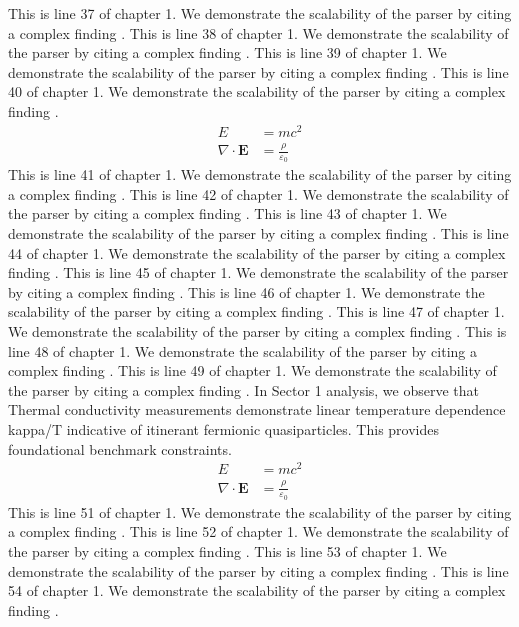 This is line 37 of chapter 1. We demonstrate the scalability of the parser by citing a complex finding \cite{ref1_37}.
This is line 38 of chapter 1. We demonstrate the scalability of the parser by citing a complex finding \cite{ref1_38}.
This is line 39 of chapter 1. We demonstrate the scalability of the parser by citing a complex finding \cite{ref1_39}.
This is line 40 of chapter 1. We demonstrate the scalability of the parser by citing a complex finding \cite{ref1_40}.
\begin{align*}
  E &= mc^2 \\
  \nabla \cdot \mathbf{E} &= \frac{\rho}{\varepsilon_0}
\end{align*}
This is line 41 of chapter 1. We demonstrate the scalability of the parser by citing a complex finding \cite{ref1_41}.
This is line 42 of chapter 1. We demonstrate the scalability of the parser by citing a complex finding \cite{ref1_42}.
This is line 43 of chapter 1. We demonstrate the scalability of the parser by citing a complex finding \cite{ref1_43}.
This is line 44 of chapter 1. We demonstrate the scalability of the parser by citing a complex finding \cite{ref1_44}.
This is line 45 of chapter 1. We demonstrate the scalability of the parser by citing a complex finding \cite{ref1_45}.
This is line 46 of chapter 1. We demonstrate the scalability of the parser by citing a complex finding \cite{ref1_46}.
This is line 47 of chapter 1. We demonstrate the scalability of the parser by citing a complex finding \cite{ref1_47}.
This is line 48 of chapter 1. We demonstrate the scalability of the parser by citing a complex finding \cite{ref1_48}.
This is line 49 of chapter 1. We demonstrate the scalability of the parser by citing a complex finding \cite{ref1_49}.
In Sector 1 analysis, we observe that Thermal conductivity measurements demonstrate linear temperature dependence kappa/T indicative of itinerant fermionic quasiparticles. This provides foundational benchmark constraints.
\begin{align*}
  E &= mc^2 \\
  \nabla \cdot \mathbf{E} &= \frac{\rho}{\varepsilon_0}
\end{align*}
This is line 51 of chapter 1. We demonstrate the scalability of the parser by citing a complex finding \cite{ref1_51}.
This is line 52 of chapter 1. We demonstrate the scalability of the parser by citing a complex finding \cite{ref1_52}.
This is line 53 of chapter 1. We demonstrate the scalability of the parser by citing a complex finding \cite{ref1_53}.
This is line 54 of chapter 1. We demonstrate the scalability of the parser by citing a complex finding \cite{ref1_54}.
